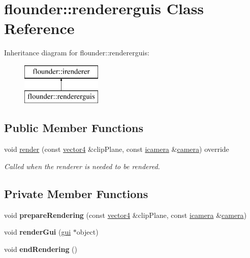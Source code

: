 \hypertarget{classflounder_1_1rendererguis}{}\section{flounder\+:\+:rendererguis Class Reference}
\label{classflounder_1_1rendererguis}
Inheritance diagram for flounder\+:\+:rendererguis\+:\begin{figure}[H]
\begin{center}
\leavevmode
\includegraphics[height=2.000000cm]{classflounder_1_1rendererguis}
\end{center}
\end{figure}
\subsection*{Public Member Functions}
\begin{DoxyCompactItemize}
\item 
void \hyperlink{classflounder_1_1rendererguis_afdf543d9a5dfbe3c7fdd9d266dd34981}{render} (const \hyperlink{classflounder_1_1vector4}{vector4} \&clip\+Plane, const \hyperlink{classflounder_1_1icamera}{icamera} \&\hyperlink{classflounder_1_1camera}{camera}) override
\begin{DoxyCompactList}\small\item\em Called when the renderer is needed to be rendered. \end{DoxyCompactList}\end{DoxyCompactItemize}
\subsection*{Private Member Functions}
\begin{DoxyCompactItemize}
\item 
\mbox{\label{classflounder_1_1rendererguis_abfd880e1c0b585073db1455968832bc3}} 
void {\bfseries prepare\+Rendering} (const \hyperlink{classflounder_1_1vector4}{vector4} \&clip\+Plane, const \hyperlink{classflounder_1_1icamera}{icamera} \&\hyperlink{classflounder_1_1camera}{camera})
\item 
\mbox{\label{classflounder_1_1rendererguis_ae5189122aea18c6e3a2111949ca0906e}} 
void {\bfseries render\+Gui} (\hyperlink{classflounder_1_1gui}{gui} $\ast$object)
\item 
\mbox{\label{classflounder_1_1rendererguis_a2680e63732fd22776075538da03b113c}} 
void {\bfseries end\+Rendering} ()
\end{DoxyCompactItemize}
